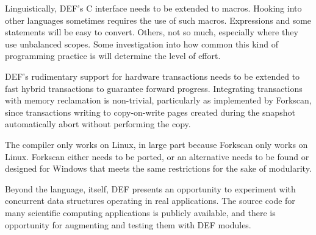 Linguistically, DEF's C interface needs to be extended to macros.  Hooking into other languages sometimes requires the use of such macros.  Expressions and some statements will be easy to convert.  Others, not so much, especially where they use unbalanced scopes.  Some investigation into how common this kind of programming practice is will determine the level of effort.

DEF's rudimentary support for hardware transactions needs to be extended to fast hybrid transactions to guarantee forward progress.  Integrating transactions with memory reclamation is non-trivial, particularly as implemented by Forkscan, since transactions writing to copy-on-write pages created during the snapshot automatically abort without performing the copy.

The compiler only works on Linux, in large part because Forkscan only works on Linux.  Forkscan either needs to be ported, or an alternative needs to be found or designed for Windows that meets the same restrictions for the sake of modularity.

Beyond the language, itself, DEF presents an opportunity to experiment with concurrent data structures operating in real applications.  The source code for many scientific computing applications is publicly available, and there is opportunity for augmenting and testing them with DEF modules.
